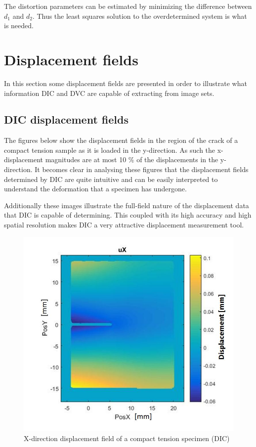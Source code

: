 The distortion parameters can be estimated by minimizing the difference between $d_1$ and $d_2$. Thus the least squares solution to the overdetermined system is what is needed.


\section{Displacement fields}
In this section some displacement fields are presented in order to illustrate what information DIC and DVC are capable of extracting from image sets.

\subsection{DIC displacement fields}
The figures below show the displacement fields in the region of the crack of a compact tension sample as it is loaded in the y-direction. As such the x-displacement magnitudes are at most 10 \% of the displacements in the y-direction. It becomes clear in analysing these figures that the displacement fields determined by DIC are quite intuitive and can be easily interpreted to understand the deformation that a specimen has undergone.

Additionally these images illustrate the full-field nature of the displacement data that DIC is capable of determining. This coupled with its high accuracy and high spatial resolution makes DIC a very attractive displacement measurement tool.

\begin{figure}[h]
    \centering
    \includegraphics[scale=0.4]{DICuyx}
    \caption{X-direction displacement field of a compact tension specimen (DIC)}
    \label{fig:DICUX}
\end{figure}

